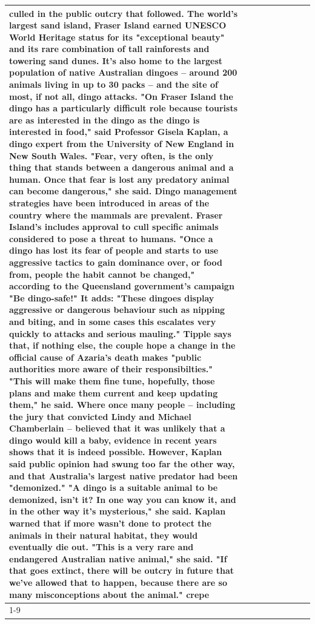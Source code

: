 \begin{table}[H]
\begin{tabular}{lllrlllll}
culled in the public outcry that followed. The world's largest sand island, Fraser Island earned UNESCO World Heritage status for its "exceptional beauty" and its rare combination of tall rainforests and towering sand dunes. It's also home to the largest population of native Australian dingoes -- around 200 animals living in up to 30 packs -- and the site of most, if not all, dingo attacks. "On Fraser Island the dingo has a particularly difficult role because tourists are as interested in the dingo as the dingo is interested in food," said Professor Gisela Kaplan, a dingo expert from the University of New England in New South Wales. "Fear, very often, is the only thing that stands between a dangerous animal and a human. Once that fear is lost any predatory animal can become dangerous," she said. Dingo management strategies have been introduced in areas of the country where the mammals are prevalent. Fraser Island's includes approval to cull specific animals considered to pose a threat to humans. "Once a dingo has lost its fear of people and starts to use aggressive tactics to gain dominance over, or food from, people the habit cannot be changed," according to the Queensland government's campaign "Be dingo-safe!" It adds: "These dingoes display aggressive or dangerous behaviour such as nipping and biting, and in some cases this escalates very quickly to attacks and serious mauling." Tipple says that, if nothing else, the couple hope a change in the official cause of Azaria's death makes "public authorities more aware of their responsibilties." "This will make them fine tune, hopefully, those plans and make them current and keep updating them," he said. Where once many people -- including the jury that convicted Lindy and Michael Chamberlain -- believed that it was unlikely that a dingo would kill a baby, evidence in recent years shows that it is indeed possible. However, Kaplan said public opinion had swung too far the other way, and that Australia's largest native predator had been "demonized." "A dingo is a suitable animal to be demonized, isn't it? In one way you can know it, and in the other way it's mysterious," she said. Kaplan warned that if more wasn't done to protect the animals in their natural habitat, they would eventually die out. "This is a very rare and endangered Australian native animal," she said. "If that goes extinct, there will be outcry in future that we've allowed that to happen, because there are so many misconceptions about the animal." crepe \\
\cline{1-9}

\end{tabular}
\end{table}
